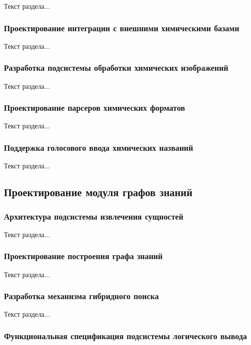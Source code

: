 Текст раздела...

\subsubsection{Проектирование интеграции с внешними химическими базами}

Текст раздела...

\subsubsection{Разработка подсистемы обработки химических изображений}

Текст раздела...

\subsubsection{Проектирование парсеров химических форматов}

Текст раздела...

\subsubsection{Поддержка голосового ввода химических названий}

Текст раздела...

\subsection{Проектирование модуля графов знаний}

\subsubsection{Архитектура подсистемы извлечения сущностей}

Текст раздела...

\subsubsection{Проектирование построения графа знаний}

Текст раздела...

\subsubsection{Разработка механизма гибридного поиска}

Текст раздела...

\subsubsection{Функциональная спецификация подсистемы логического вывода}

